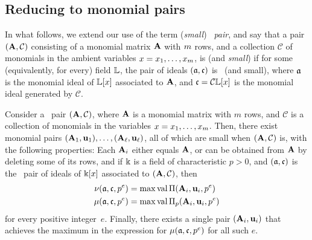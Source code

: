 \documentclass{amsart}
\begin{document}
\subsection{Reducing to monomial pairs}

In what follows, we extend our use of the term (\emph{small}) \emph{\compatible\ pair}, and say that a pair $(\mathbf{A}, \mathcal{C})$ consisting of a monomial matrix $\mathbf{A}$ with $m$ rows, and a collection $\mathcal{C}$ of monomials in the ambient variables $x = x_1, \ldots, x_{m}$, is \emph{\compatible} (and \emph{small}) if for some (equivalently, for every) field $\mathbb{L}$, the pair of ideals $(\mathfrak{a}, \mathfrak{c})$ is  \compatible\ (and small),  where $\mathfrak{a}$ is the monomial ideal of $\mathbb{L}[x]$ associated to $\mathbf{A}$, and $\mathfrak{c} = \mathcal{C} \mathbb{L}[x]$ is the monomial ideal generated by $\mathcal{C}$.

\begin{theorem}
\label{reduce to diagonal general: T}
Consider a \compatible\ pair $(\mathbf{A}, \mathcal{C})$, where $\mathbf{A}$ is a monomial matrix with $m$ rows, and $\mathcal{C}$ is a collection of monomials in the variables $x = x_1, \ldots, x_m$.    Then, there exist monomial pairs $(\mathbf{A}_1, \mathbf{u}_1), \ldots, (\mathbf{A}_{\ell}, \mathbf{u}_{\ell})$, all of which are small when $(\mathbf{A}, \mathcal{C})$ is, with the following properties\textup:  Each $\mathbf{A}_i$ either equals $\mathbf{A}$, or can be obtained from $\mathbf{A}$ by deleting some of its rows, and if $\Bbbk$ is a field of characteristic $p>0$, and $(\mathfrak{a}, \mathfrak{c})$ is the \compatible\ pair of ideals of $\Bbbk[x]$ associated to $(\mathbf{A}, \mathcal{C})$, then 
\begin{align*}
\nu(\mathfrak{a}, \mathfrak{c}, p^e) & = \max  \operatorname{val} \Pi(\mathbf{A}_i, \mathbf{u}_i, p^e)  \\ 
\mu(\mathfrak{a}, \mathfrak{c}, p^e) & = \max  \operatorname{val} \Pi_p(\mathbf{A}_i, \mathbf{u}_i, p^e) 
\end{align*}
for every positive integer~$e$.  Finally, there exists a single pair $(\mathbf{A}_i, \mathbf{u}_i)$ that achieves the maximum in the expression for $\mu(\mathfrak{a}, \mathfrak{c}, p^e)$ for all such $e$.
\end{theorem}
\end{document}
